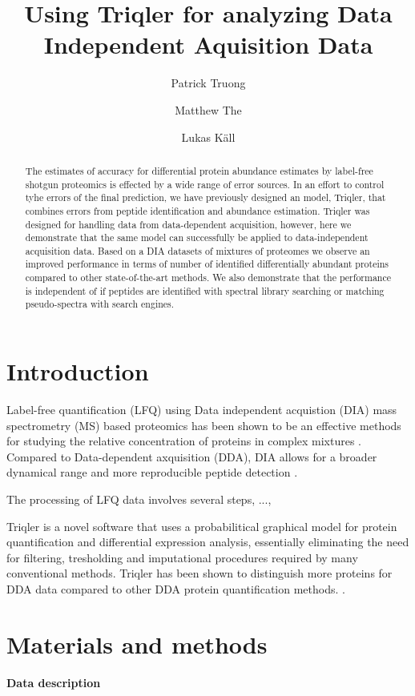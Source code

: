 \documentclass[10pt,letterpaper]{article}
\title{Using Triqler for analyzing Data Independent Aquisition Data}
\author{Patrick Truong \and Matthew The \and Lukas K\"{a}ll}
\begin{document}
\maketitle

\begin{abstract}

The estimates of accuracy for differential protein abundance estimates by label-free shotgun proteomics is effected by a wide range of error sources. In an effort to control tyhe errors of the final prediction, we have previously designed an model, Triqler, that combines errors from peptide identification and abundance estimation.
Triqler was designed for handling data from data-dependent acquisition, however, here we demonstrate that the same model can successfully be applied to data-independent acquisition data. Based on a DIA datasets of mixtures of proteomes we observe an improved performance in terms of number of identified differentially abundant proteins compared to other state-of-the-art methods. We also demonstrate that the performance is independent of if peptides are identified with spectral library searching or matching pseudo-spectra with search engines. 
\end{abstract}
  

\section*{Introduction}
Label-free quantification (LFQ) using Data independent acquistion (DIA) mass spectrometry (MS) based proteomics has been shown to be an effective methods for studying the relative concentration of proteins in complex mixtures \cite{venable2004automated}. Compared to Data-dependent axquisition (DDA), DIA allows for a broader dynamical range and more reproducible peptide detection \cite{zhang2020DIA, Lu2021DIAmeter}.

The processing of LFQ data involves several steps, ..., 
 
Triqler is a novel software that uses a probabilitical graphical model for protein quantification and differential expression analysis, essentially eliminating the need for filtering, tresholding and imputational procedures required by many conventional methods. Triqler has been shown to distinguish more proteins for DDA data compared to other DDA protein quantification methods. \cite{The2018Integrated}. 

 
\section*{Materials and methods}
\textbf{Data description}
\end{document}
